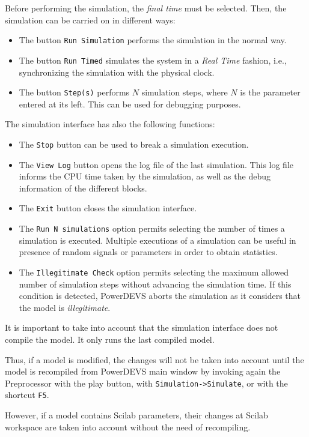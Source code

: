 Before performing the simulation, the \emph{final time} must be selected. Then, the simulation can be carried on in different ways:
\begin{itemize}
 \item The button \verb"Run Simulation" performs the simulation in the normal way.
 \item The button \verb"Run Timed" simulates the system in a \emph{Real Time} fashion, i.e., synchronizing the simulation with the physical clock. 
 \item The button \verb"Step(s)" performs $N$ simulation steps, where $N$ is the parameter entered at its left. This can be used for debugging purposes.
\end{itemize}
The simulation interface has also the following functions:
\begin{itemize}
 \item The \verb"Stop" button can be used to break a simulation execution.
 \item The \verb"View Log" button opens the log file of the last simulation. This log file informs the CPU time taken by the simulation, as well as the debug information of the different blocks.
 \item The \verb"Exit" button closes the simulation interface.
 \item The \verb"Run N simulations" option permits selecting the number of times a simulation is executed. Multiple executions of a simulation can be useful in presence of random signals or parameters in order to obtain statistics.
 \item The \verb"Illegitimate Check" option permits selecting the maximum allowed number of simulation steps without advancing the simulation time. If this condition is detected, PowerDEVS aborts the simulation as it considers that the model is \emph{illegitimate}.
\end{itemize}

It is important to take into account that the simulation interface does not compile the model. It only runs the last compiled model. 

Thus, if a model is modified, the changes will not be taken into account until the  model is recompiled from PowerDEVS main window by invoking again the Preprocessor with the play button,  with \verb"Simulation->Simulate", or with the shortcut \verb"F5".

However, if a model contains Scilab parameters, their changes at Scilab workspace are taken into account without the need of recompiling.   
 
